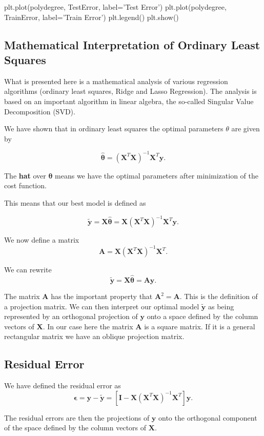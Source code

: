 \documentclass[%
oneside,                 %
final,                   %
10pt]{article}
\begin{document}
plt.plot(polydegree, TestError, label='Test Error')
plt.plot(polydegree, TrainError, label='Train Error')
plt.legend()
plt.show()

\epycod


\subsection{Mathematical Interpretation of Ordinary Least Squares}

What is presented here is a mathematical analysis of various regression algorithms (ordinary least  squares, Ridge and Lasso Regression). The analysis is based on an important algorithm in linear algebra, the so-called Singular Value Decomposition (SVD). 

We have shown that in ordinary least squares the optimal parameters $\theta$ are given by

\[
\hat{\bm{\theta}} = \left(\bm{X}^T\bm{X}\right)^{-1}\bm{X}^T\bm{y}.
\]

The \textbf{hat} over $\bm{\theta}$ means we have the optimal parameters after minimization of the cost function.

This means that our best model is defined as

\[
\tilde{\bm{y}}=\bm{X}\hat{\bm{\theta}} = \bm{X}\left(\bm{X}^T\bm{X}\right)^{-1}\bm{X}^T\bm{y}.
\]

We now define a matrix
\[
\bm{A}=\bm{X}\left(\bm{X}^T\bm{X}\right)^{-1}\bm{X}^T.
\]

We can rewrite
\[
\tilde{\bm{y}}=\bm{X}\hat{\bm{\theta}} = \bm{A}\bm{y}.
\]

The matrix $\bm{A}$ has the important property that $\bm{A}^2=\bm{A}$. This is the definition of a projection matrix.
We can then interpret our optimal model $\tilde{\bm{y}}$ as being represented  by an orthogonal  projection of $\bm{y}$ onto a space defined by the column vectors of $\bm{X}$.  In our case here the matrix $\bm{A}$ is a square matrix. If it is a general rectangular matrix we have an oblique projection matrix.

\subsection{Residual Error}

We have defined the residual error as
\[
\bm{\epsilon}=\bm{y}-\tilde{\bm{y}}=\left[\bm{I}-\bm{X}\left(\bm{X}^T\bm{X}\right)^{-1}\bm{X}^T\right]\bm{y}.
\]

The residual errors are then the projections of $\bm{y}$ onto the orthogonal component of the space defined by the column vectors of $\bm{X}$.
\end{document}
